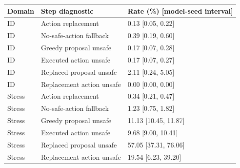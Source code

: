 \begin{tabular}{lll}
\toprule
Domain & Step diagnostic & Rate (\%) [model-seed interval] \\
\midrule
ID & Action replacement & 0.13 [0.05, 0.22] \\
ID & No-safe-action fallback & 0.39 [0.19, 0.60] \\
ID & Greedy proposal unsafe & 0.17 [0.07, 0.28] \\
ID & Executed action unsafe & 0.17 [0.07, 0.27] \\
ID & Replaced proposal unsafe & 2.11 [0.24, 5.05] \\
ID & Replacement action unsafe & 0.00 [0.00, 0.00] \\
Stress & Action replacement & 0.34 [0.21, 0.47] \\
Stress & No-safe-action fallback & 1.23 [0.75, 1.82] \\
Stress & Greedy proposal unsafe & 11.13 [10.45, 11.87] \\
Stress & Executed action unsafe & 9.68 [9.00, 10.41] \\
Stress & Replaced proposal unsafe & 57.05 [37.31, 76.06] \\
Stress & Replacement action unsafe & 19.54 [6.23, 39.20] \\
\bottomrule
\end{tabular}
